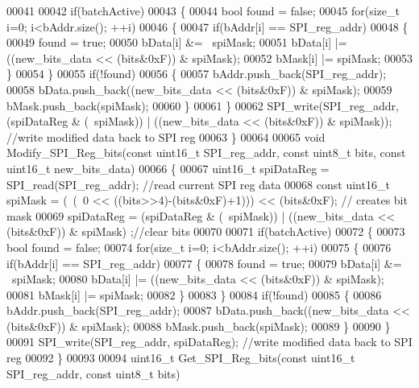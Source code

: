 \begin{DoxyCode}
00041 
00042     \textcolor{keywordflow}{if}(batchActive)
00043     \{
00044     \textcolor{keywordtype}{bool} found = \textcolor{keyword}{false};
00045     \textcolor{keywordflow}{for}(\textcolor{keywordtype}{size\_t} i=0; i<bAddr.size(); ++i)
00046     \{
00047         \textcolor{keywordflow}{if}(bAddr[i] == SPI\_reg\_addr)
00048         \{
00049             found = \textcolor{keyword}{true};
00050             bData[i] &= ~spiMask;
00051             bData[i] |= ((new\_bits\_data << (bits&0xF)) & spiMask);
00052             bMask[i] |= spiMask;
00053         \}
00054     \}
00055     \textcolor{keywordflow}{if}(!found)
00056     \{
00057         bAddr.push\_back(SPI\_reg\_addr);
00058         bData.push\_back((new\_bits\_data << (bits&0xF)) & spiMask);
00059         bMask.push\_back(spiMask);
00060     \}
00061     \}
00062     SPI_write(SPI\_reg\_addr, (spiDataReg & (~spiMask)) | ((new\_bits\_data << (bits&0xF)) & spiMask)); \textcolor{comment}{//write
       modified data back to SPI reg}
00063 \}
00064 
00065 \textcolor{keywordtype}{void} Modify_SPI_Reg_bits(\textcolor{keyword}{const} uint16\_t SPI\_reg\_addr, \textcolor{keyword}{const} uint8\_t bits, \textcolor{keyword}{const} uint16\_t new\_bits\_data)
00066 \{
00067     uint16\_t spiDataReg = SPI_read(SPI\_reg\_addr); \textcolor{comment}{//read current SPI reg data}
00068     \textcolor{keyword}{const} uint16\_t spiMask = (~(~0 << ((bits>>4)-(bits&0xF)+1))) << (bits&0xF); \textcolor{comment}{// creates bit mask}
00069     spiDataReg = (spiDataReg & (~spiMask)) | ((new\_bits\_data << (bits&0xF)) & spiMask) ;\textcolor{comment}{//clear bits}
00070 
00071     \textcolor{keywordflow}{if}(batchActive)
00072     \{
00073     \textcolor{keywordtype}{bool} found = \textcolor{keyword}{false};
00074     \textcolor{keywordflow}{for}(\textcolor{keywordtype}{size\_t} i=0; i<bAddr.size(); ++i)
00075     \{
00076         \textcolor{keywordflow}{if}(bAddr[i] == SPI\_reg\_addr)
00077         \{
00078             found = \textcolor{keyword}{true};
00079             bData[i] &= ~spiMask;
00080             bData[i] |= ((new\_bits\_data << (bits&0xF)) & spiMask);
00081             bMask[i] |= spiMask;
00082         \}
00083     \}
00084     \textcolor{keywordflow}{if}(!found)
00085     \{
00086         bAddr.push\_back(SPI\_reg\_addr);
00087         bData.push\_back((new\_bits\_data << (bits&0xF)) & spiMask);
00088         bMask.push\_back(spiMask);
00089     \}
00090     \}
00091     SPI_write(SPI\_reg\_addr, spiDataReg); \textcolor{comment}{//write modified data back to SPI reg}
00092 \}
00093 
00094 uint16\_t Get_SPI_Reg_bits(\textcolor{keyword}{const} uint16\_t SPI\_reg\_addr, \textcolor{keyword}{const} uint8\_t bits)

\end{DoxyCode}
